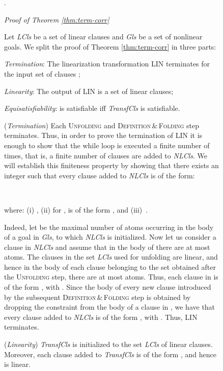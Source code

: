 \documentclass[english]{tlp}
\newcommand{\eop}{\hfill}
\begin{document}
\begin{figure}[ht]
\begin{flushleft}
\begin{minipage}{124mm}
.
\hfill \eop





\bigskip

\noindent
{\it Proof of Theorem \ref{thm:term-corr}} 

\noindent
Let {\it LCls} be a set of linear clauses and \textit{Gls} be a set of nonlinear goals. 
We split the proof of Theorem \ref{thm:term-corr} in three parts:

\noindent
{\it Termination}: The \textrm{linearization} transformation LIN terminates for the input set of clauses ;

\noindent
{\it Linearity}: The output  of LIN is a set of linear clauses;

\noindent
{\it Equisatisfiability}:  is satisfiable iff
	\textit{TransfCls} is satisfiable.

\smallskip

\noindent
({\it Termination}) 
Each \textsc{Unfolding} and \textsc{Definition}\,\&\,\textsc{Folding} step terminates.
Thus, in order to prove the termination of LIN it is enough to show
that the while loop is executed a finite number of times, that is,
a finite number of clauses are added to {\it NLCls}.
We will establish this finiteness property by showing that there exists
an integer  such that every clause added to {\it NLCls} is of the form:

 \hfill  ~~~

\noindent
where: (i) , (ii) for ,  is of the form
, and (iii)~.

Indeed, let  be the maximal number of atoms occurring in the body
of a goal in {\it Gls}, to which {\it NLCls} 
is initialized.
Now let us consider a clause  in {\it NLCls} and assume that
in the body of  there are at most  atoms.
The clauses in the set \textit{LCls} used for unfolding  are linear, and hence
in the body of each clause belonging to the set  obtained after the \textsc{Unfolding}
step, there are at most  atoms.
Thus, each clause in 
is of the form , with .
Since the body of every new clause introduced by the subsequent
\textsc{Definition}\,\&\,\textsc{Folding} step is obtained 
by dropping the constraint from the body of a clause in ,
we have that every clause added to {\it NLCls} is of the form 
 ,
with .
Thus, LIN terminates.

\smallskip
\noindent
({\it Linearity}) \textit{TransfCls} is initialized to the set
\textit{LCls} of linear clauses. Moreover, each clause added to \textit{TransfCls}
is of the form , and hence
is linear.


\end{minipage}
\end{flushleft}
\end{figure}
\end{document}
